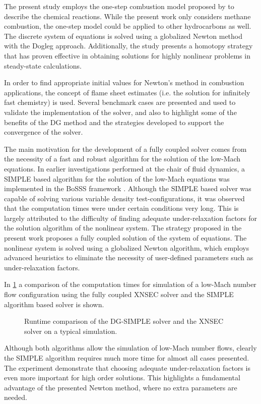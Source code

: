 The present study employs the one-step combustion model proposed by \textcite{fernandez-tarrazoSimpleOnestepChemistry2006} to describe the chemical reactions. While the present work only considers methane combustion, the one-step model could be applied to other hydrocarbons as well. The discrete system of equations is solved using a globalized Newton method with the Dogleg approach. Additionally, the study presents a homotopy strategy that has proven effective in obtaining solutions for highly nonlinear problems in steady-state calculations.

In order to find appropriate initial values for Newton's method in combustion applications, the concept of flame sheet estimates (i.e. the solution for infinitely fast chemistry) is used. Several benchmark cases are presented and used to validate the implementation of the solver, and also to highlight  some of the benefits of the DG method and the strategies developed to support the convergence of the solver. 

The main motivation for the development of a fully coupled solver comes from the necessity of a fast and robust algorithm for the solution of the low-Mach equations. In earlier investigations performed at the chair of fluid dynamics, a SIMPLE based algorithm for the solution of the low-Mach equations was implemented in the \gls{BoSSS} framework \parencite{kleinSIMPLEBasedDiscontinuous2013,kleinExtensionSIMPLEBased2015,kleinHighorderDiscontinuousGalerkin2016}. Although the SIMPLE based solver was capable of solving various variable density test-configurations, it was observed that the computation times were under certain conditions very long. This is largely attributed to the difficulty of finding adequate under-relaxation factors for the solution algorithm of the nonlinear system. The strategy proposed in the present work proposes a fully coupled solution of the system of equations. The nonlinear system is solved using a globalized Newton algorithm, which employs advanced heuristics to eliminate the necessity of user-defined parameters such as under-relaxation factors.

In \cref{fig:RuntimeComparisonk2} a comparison of the computation times for simulation of a low-Mach number flow configuration using the fully coupled \gls{XNSEC} solver and the SIMPLE algorithm based solver is shown.  
\begin{figure}[t]	
	\centering
	\caption{Runtime comparison of the DG-SIMPLE solver and the XNSEC solver on a typical simulation.}
	\label{fig:RuntimeComparisonk2}
\end{figure}
Although both algorithms allow the simulation of low-Mach number flows, clearly the SIMPLE algorithm requires much more time for almost all cases presented. The experiment demonstrate that choosing adequate under-relaxation factors is even more important for high order solutions. This highlights a fundamental advantage of the presented Newton method, where no extra parameters are needed. 
